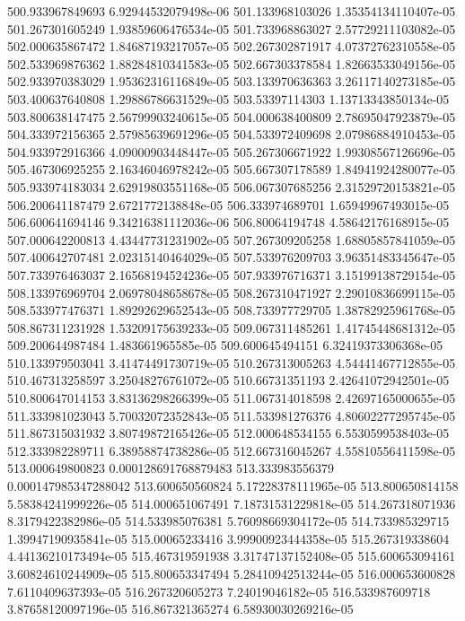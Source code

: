 {500.933967849693 6.92944532079498e-06
501.133968103026 1.35354134110407e-05
501.267301605249 1.93859606476534e-05
501.733968863027 2.57729211103082e-05
502.000635867472 1.84687193217057e-05
502.267302871917 4.07372762310558e-05
502.533969876362 1.88284810341583e-05
502.667303378584 1.82663533049156e-05
502.933970383029 1.95362316116849e-05
503.133970636363 3.26117140273185e-05
503.400637640808 1.29886786631529e-05
503.53397114303 1.13713343850134e-05
503.800638147475 2.56799903240615e-05
504.000638400809 2.78695047923879e-05
504.333972156365 2.57985639691296e-05
504.533972409698 2.07986884910453e-05
504.933972916366 4.09000903448447e-05
505.267306671922 1.99308567126696e-05
505.467306925255 2.16346046978242e-05
505.667307178589 1.84941924280077e-05
505.933974183034 2.62919803551168e-05
506.067307685256 2.31529720153821e-05
506.200641187479 2.6721772138848e-05
506.333974689701 1.65949967493015e-05
506.600641694146 9.34216381112036e-06
506.80064194748 4.58642176168915e-05
507.000642200813 4.43447731231902e-05
507.267309205258 1.68805857841059e-05
507.400642707481 2.02315140464029e-05
507.533976209703 3.96351483345647e-05
507.733976463037 2.16568194524236e-05
507.933976716371 3.15199138729154e-05
508.133976969704 2.06978048658678e-05
508.267310471927 2.29010836699115e-05
508.533977476371 1.89292629652543e-05
508.733977729705 1.38782925961768e-05
508.867311231928 1.53209175639233e-05
509.067311485261 1.41745448681312e-05
509.200644987484 1.483661965585e-05
509.600645494151 6.32419373306368e-05
510.133979503041 3.41474491730719e-05
510.267313005263 4.54441467712855e-05
510.467313258597 3.25048276761072e-05
510.66731351193 2.42641072942501e-05
510.800647014153 3.83136298266399e-05
511.067314018598 2.42697165000655e-05
511.333981023043 5.70032072352843e-05
511.533981276376 4.80602277295745e-05
511.867315031932 3.80749872165426e-05
512.000648534155 6.5530599538403e-05
512.333982289711 6.38958874738286e-05
512.667316045267 4.55810556411598e-05
513.000649800823 0.000128691768879483
513.333983556379 0.000147985347288042
513.600650560824 5.17228378111965e-05
513.800650814158 5.58384241999226e-05
514.000651067491 7.18731531229818e-05
514.267318071936 8.3179422382986e-05
514.533985076381 5.76098669304172e-05
514.733985329715 1.39947190935841e-05
515.00065233416 3.99900923444358e-05
515.267319338604 4.44136210173494e-05
515.467319591938 3.31747137152408e-05
515.600653094161 3.60824610244909e-05
515.800653347494 5.28410942513244e-05
516.000653600828 7.6110409637393e-05
516.267320605273 7.24019046182e-05
516.533987609718 3.87658120097196e-05
516.867321365274 6.58930030269216e-05
}
